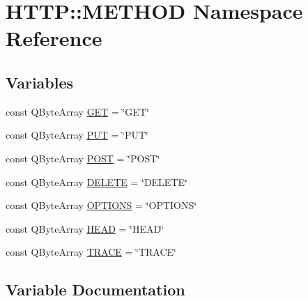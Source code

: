 \hypertarget{namespace_h_t_t_p_1_1_m_e_t_h_o_d}{}\section{H\+T\+TP\+:\+:M\+E\+T\+H\+OD Namespace Reference}
\label{namespace_h_t_t_p_1_1_m_e_t_h_o_d}
\subsection*{Variables}
\begin{DoxyCompactItemize}
\item 
const Q\+Byte\+Array \hyperlink{namespace_h_t_t_p_1_1_m_e_t_h_o_d_a3545e6e50dcda9854fa124b499c760c0}{G\+ET} = \char`\"{}G\+ET\char`\"{}
\item 
const Q\+Byte\+Array \hyperlink{namespace_h_t_t_p_1_1_m_e_t_h_o_d_a5be8aa9a629a4160d598d64f5f2fbca6}{P\+UT} = \char`\"{}P\+UT\char`\"{}
\item 
const Q\+Byte\+Array \hyperlink{namespace_h_t_t_p_1_1_m_e_t_h_o_d_ad8b58e0e91909e8a6f44b511e5e167e8}{P\+O\+ST} = \char`\"{}P\+O\+ST\char`\"{}
\item 
const Q\+Byte\+Array \hyperlink{namespace_h_t_t_p_1_1_m_e_t_h_o_d_af434343fedd0a49f6de1597bb7c78754}{D\+E\+L\+E\+TE} = \char`\"{}D\+E\+L\+E\+TE\char`\"{}
\item 
const Q\+Byte\+Array \hyperlink{namespace_h_t_t_p_1_1_m_e_t_h_o_d_afc844c661da4c8138a7018c25de2af57}{O\+P\+T\+I\+O\+NS} = \char`\"{}O\+P\+T\+I\+O\+NS\char`\"{}
\item 
const Q\+Byte\+Array \hyperlink{namespace_h_t_t_p_1_1_m_e_t_h_o_d_a6f865e8514115e0c831adf4bf00297b1}{H\+E\+AD} = \char`\"{}H\+E\+AD\char`\"{}
\item 
const Q\+Byte\+Array \hyperlink{namespace_h_t_t_p_1_1_m_e_t_h_o_d_ab08df83b67d446052183fd816b559a0e}{T\+R\+A\+CE} = \char`\"{}T\+R\+A\+CE\char`\"{}
\end{DoxyCompactItemize}


\subsection{Variable Documentation}
\mbox{\label{namespace_h_t_t_p_1_1_m_e_t_h_o_d_af434343fedd0a49f6de1597bb7c78754}} 
